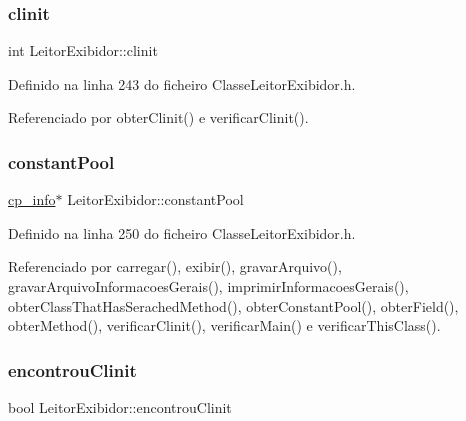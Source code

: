 \subsubsection{\texorpdfstring{clinit}{clinit}}
{\footnotesize\ttfamily int Leitor\+Exibidor\+::clinit\hspace{0.3cm}{\ttfamily [private]}}



Definido na linha 243 do ficheiro Classe\+Leitor\+Exibidor.\+h.



Referenciado por obter\+Clinit() e verificar\+Clinit().

\mbox{\label{classLeitorExibidor_ac92916cbf475e31ce0f2475d982ddaea}} 
\subsubsection{\texorpdfstring{constant\+Pool}{constantPool}}
{\footnotesize\ttfamily \hyperlink{structcp__info}{cp\+\_\+info}$\ast$ Leitor\+Exibidor\+::constant\+Pool\hspace{0.3cm}{\ttfamily [private]}}



Definido na linha 250 do ficheiro Classe\+Leitor\+Exibidor.\+h.



Referenciado por carregar(), exibir(), gravar\+Arquivo(), gravar\+Arquivo\+Informacoes\+Gerais(), imprimir\+Informacoes\+Gerais(), obter\+Class\+That\+Has\+Serached\+Method(), obter\+Constant\+Pool(), obter\+Field(), obter\+Method(), verificar\+Clinit(), verificar\+Main() e verificar\+This\+Class().

\mbox{\label{classLeitorExibidor_a93a1aa14204f0445a97304cc504a3cf0}} 
\subsubsection{\texorpdfstring{encontrou\+Clinit}{encontrouClinit}}
{\footnotesize\ttfamily bool Leitor\+Exibidor\+::encontrou\+Clinit\hspace{0.3cm}{\ttfamily [private]}}



